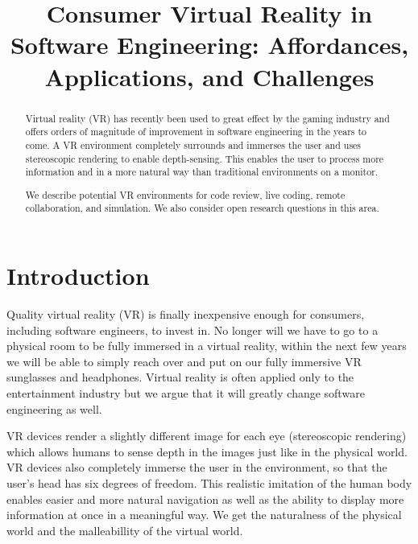 \documentclass[conference]{IEEEtran}
\begin{document}
\title{Consumer Virtual Reality in Software Engineering: Affordances, Applications, and Challenges}

\author{
\and
{}
\and
{}
}

\maketitle
\begin{abstract}
Virtual reality (VR) has recently been used to great effect by the gaming industry and offers orders of magnitude of improvement in software engineering in the years to come.
A VR environment completely surrounds and immerses the user and uses stereoscopic rendering to enable depth-sensing. This enables the user to process more information and in a more natural way than traditional environments on a monitor.

We describe potential VR environments for code review, live coding, remote collaboration, and simulation.
We also consider open research questions in this area.
\end{abstract}

\section{Introduction}
Quality virtual reality (VR) is finally inexpensive enough for consumers, including software engineers, to invest in. 
No longer will we have to go to a physical room to be fully immersed in a virtual reality, within the next few years we will be able to simply reach over and put on our fully immersive VR sunglasses and headphones. 
Virtual reality is often applied only to the entertainment industry but we argue that it will greatly change software engineering as well. 

VR devices render a slightly different image for each eye (stereoscopic rendering) which allows humans to sense depth in the images just like in the physical world. 
VR devices also completely immerse the user in the environment, so that the user's head has six degrees of freedom. 
This realistic imitation of the human body enables easier and more natural navigation as well as the ability to display more information at once in a meaningful way. 
We get the naturalness of the physical world and the malleabillity of the virtual world.
\end{document}
